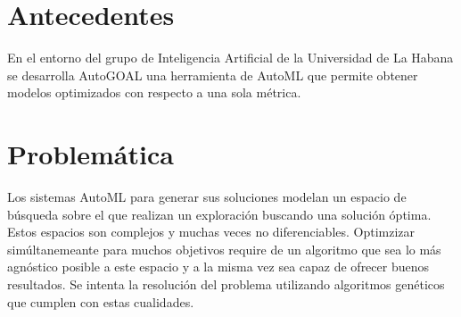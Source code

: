 





\section*{Antecedentes}
En el entorno del grupo de Inteligencia Artificial de la Universidad de La Habana se desarrolla AutoGOAL una herramienta de AutoML que permite obtener modelos optimizados con respecto a una sola m\'etrica.

\section*{Problem\'atica}
Los sistemas AutoML para generar sus soluciones modelan un espacio de b\'usqueda sobre el que realizan un exploraci\'on buscando una soluci\'on \'optima.
Estos espacios son complejos y muchas veces no diferenciables.
Optimzizar sim\'ultanemeante para muchos objetivos require de un algoritmo que sea lo m\'as agn\'ostico posible a este espacio y a la misma vez sea capaz de ofrecer buenos resultados.
Se intenta la resoluci\'on del problema utilizando algoritmos gen\'eticos que cumplen con estas cualidades.



